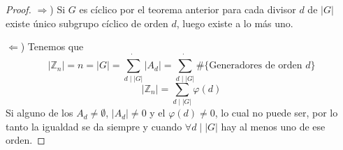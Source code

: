 \begin{proof}
	$\Rightarrow$) Si $G$ es cíclico por el teorema anterior para cada divisor $d$ de $|G|$ existe único subgrupo cíclico de orden $d$, luego existe a lo más uno.

	$\Leftarrow$) Tenemos que
	\begin{equation*}
		|\mathbb{Z}_n| = n = |G| = \dot{\sum_{d \mid |G|}} |A_d| = \dot{\sum_{d \mid |G|}} \# \{ \text{Generadores de orden } d \}
	\end{equation*}
	\begin{equation*}
		|\mathbb{Z}_n| = \sum_{d \mid |G|} \varphi(d)
	\end{equation*}
	Si alguno de los $A_d \neq \emptyset$, $|A_d| \neq 0$ y el $\varphi(d) \neq 0$, lo cual no puede ser, por lo tanto la igualdad se da siempre y cuando $\forall d \mid |G|$ hay al menos uno de ese orden.
\end{proof}

